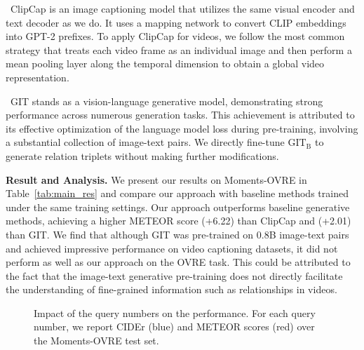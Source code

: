 \documentclass[letterpaper]{article}
\begin{document}
\textbullet  \ ClipCap \cite{mokady2021clipcap} is an image captioning model that utilizes the same visual encoder and text decoder as we do.
It uses a mapping network to convert CLIP embeddings into GPT-2 prefixes.
To apply ClipCap for videos, we follow the most common strategy that treats each video frame as an individual image and then perform a mean pooling layer along the temporal dimension to obtain a global video representation.

\textbullet  \ GIT \cite{wang2022git} stands as a vision-language generative model, demonstrating strong performance across numerous generation tasks. This achievement is attributed to its effective optimization of the language model loss during pre-training, involving a substantial collection of image-text pairs.
We directly fine-tune $\text{GIT}_{\text{B}}$ to generate relation triplets without making further modifications.





\noindent\textbf{Result and Analysis. }
We present our results on Moments-OVRE in Table~\ref{tab:main_res} and compare our approach with baseline methods trained under the same training settings.
Our approach outperforms baseline generative methods, achieving a higher METEOR score (+6.22) than ClipCap and (+2.01) than GIT.
We find that although GIT was pre-trained on 0.8B image-text pairs and achieved impressive performance on video captioning datasets, it did not perform as well as our approach on the OVRE task. This could be attributed to the fact that the image-text generative pre-training does not directly facilitate the understanding of fine-grained information such as relationships in videos.

\begin{figure}
\centering
{}
\caption{Impact of the query numbers on the performance. For each query number, we report CIDEr (blue) and METEOR scores (red)  over the Moments-OVRE test set. }
\label{fig:abl_qnumber}
\end{figure}
\end{document}

